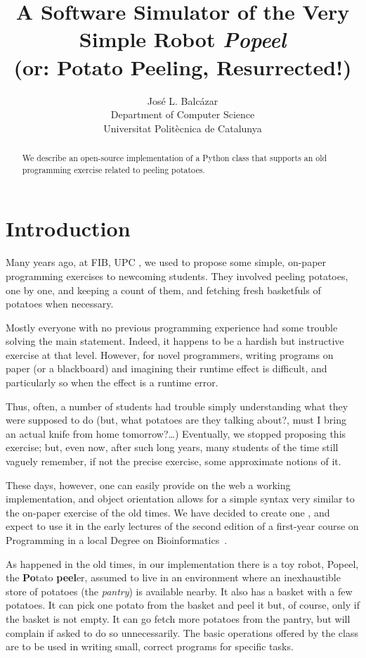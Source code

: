 \documentclass[12pt]{article}
\title{A Software Simulator of the Very Simple Robot \emph{Popeel}%
\\ \medskip\Large
(or: Potato Peeling, Resurrected!)
}
\author{Jos\'e L. Balc\'azar \\
{Department of Computer Science} \\
{Universitat Polit\`ecnica de Catalunya}}
\begin{document}
\maketitle

\begin{abstract}
We describe an open-source implementation of a
Python class that supports an old programming
exercise related to peeling potatoes.
\end{abstract}


\section{Introduction}%

Many years ago, at FIB, UPC \cite{FIB}, we used to 
propose some simple, on-paper programming exercises 
to newcoming students. They involved peeling potatoes, 
one by one, and keeping a count of them, and fetching 
fresh basketfuls of potatoes when necessary. 

Mostly everyone with no previous programming 
experience had some trouble solving the main
statement. Indeed, it happens to be a hardish but 
instructive exercise at that level. However, 
for novel programmers, writing programs on paper 
(or a blackboard) and imagining their runtime effect 
is difficult, and particularly so when the effect 
is a runtime error.

Thus, often, a number of students had trouble simply understanding 
what they were supposed to do \cite{PBblog} (but, what 
potatoes are they talking about?, must I bring an actual 
knife from home tomorrow?\dots) Eventually, we stopped 
proposing this exercise; but, even now, after such long years,
many students of the time still vaguely remember, 
if not the precise exercise, some approximate
notions of it.

These days, however, one can easily provide on the 
web a working implementation, and object orientation
allows for a simple syntax very similar to the 
on-paper exercise of the old times. We have decided
to create one \cite{Popeel}, and expect to use it in the early
lectures of the second edition of a first-year
course on Programming \cite{mireport} in a local 
Degree on Bioinformatics~\cite{BDBI}.

As happened in the old times, in our implementation
there is a toy robot, Popeel, the 
{\bf Po}tato {\bf peel}er, assumed to live in an 
environment where an inexhaustible store of potatoes 
(the \emph{pantry})
is available nearby. It also has a basket with a few 
potatoes. It can pick one potato from the basket and 
peel it but, of course, only if the basket is not empty. It can go 
fetch more potatoes from the pantry, 
but will complain 
if asked to do so unnecessarily. The basic operations
offered by the class are to be used in writing small,
correct programs for specific tasks.
\end{document}
